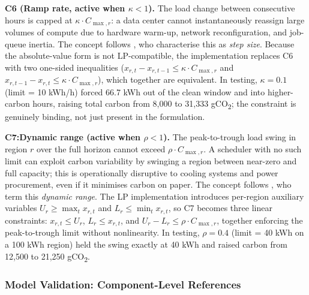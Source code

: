 \documentclass[11pt, a4paper]{article}
\begin{document}
\textbf{C6 (Ramp rate, active when $\kappa < 1$).}
The load change between consecutive hours is capped at $\kappa \cdot C_{\max,r}$: a data center cannot instantaneously reassign large volumes of compute due to hardware warm-up, network reconfiguration, and job-queue inertia. The concept follows \citet{wijayawardana2025scheduling}, who characterise this as \emph{step size}. Because the absolute-value form is not LP-compatible, the implementation replaces C6 with two one-sided inequalities ($x_{r,t} - x_{r,t-1} \leq \kappa \cdot C_{\max,r}$ and $x_{r,t-1} - x_{r,t} \leq \kappa \cdot C_{\max,r}$), which together are equivalent. In testing, $\kappa = 0.1$ (limit = 10 kWh/h) forced 66.7 kWh out of the clean window and into higher-carbon hours, raising total carbon from 8{,}000 to 31{,}333 gCO\textsubscript{2}; the constraint is genuinely binding, not just present in the formulation.

\textbf{C7:Dynamic range (active when $\rho < 1$).}
The peak-to-trough load swing in region $r$ over the full horizon cannot exceed $\rho \cdot C_{\max,r}$. A scheduler with no such limit can exploit carbon variability by swinging a region between near-zero and full capacity; this is operationally disruptive to cooling systems and power procurement, even if it minimises carbon on paper. The concept follows \citet{wijayawardana2025scheduling}, who term this \emph{dynamic range}. The LP implementation introduces per-region auxiliary variables $U_r \geq \max_t x_{r,t}$ and $L_r \leq \min_t x_{r,t}$, so C7 becomes three linear constraints: $x_{r,t} \leq U_r$, $L_r \leq x_{r,t}$, and $U_r - L_r \leq \rho \cdot C_{\max,r}$, together enforcing the peak-to-trough limit without nonlinearity. In testing, $\rho = 0.4$ (limit = 40 kWh on a 100 kWh region) held the swing exactly at 40 kWh and raised carbon from 12{,}500 to 21{,}250 gCO\textsubscript{2}.

\subsubsection{Model Validation: Component-Level References}
\end{document}
